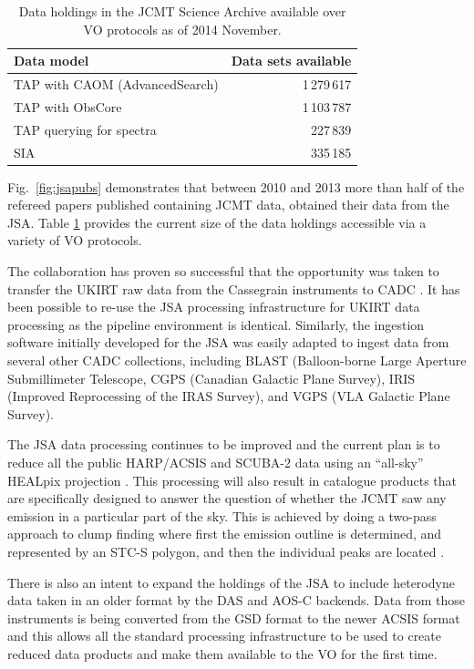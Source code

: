 \documentclass[final,authoryear,5p,times,twocolumn]{elsarticle}
\begin{document}
\begin{table}
\caption{Data holdings in the JCMT Science Archive available over VO
  protocols as of 2014 November.}
\label{tab:cadcvo}
\begin{center}
\begin{tabular}{|l|r|}
\hline
Data model & Data sets available\\ \hline
TAP with CAOM (AdvancedSearch) & 1\,279\,617 \\
TAP with ObsCore & 1\,103\,787\\
TAP querying for spectra & 227\,839\\
SIA  & 335\,185\\ \hline
\end{tabular}
\end{center}
\end{table}

Fig.~\ref{fig:jsapubs} demonstrates that between 2010 and 2013 more
than half of the refereed papers published containing JCMT data,
obtained their data from the JSA. Table \ref{tab:cadcvo} provides the
current size of the data holdings accessible via a variety of VO protocols.

The collaboration has proven so successful that the opportunity was
taken to transfer the UKIRT raw data from the Cassegrain instruments
to CADC \citep{adassxxiii_P01}. It has been possible to re-use
the JSA processing infrastructure for UKIRT data processing as the
pipeline environment is identical.  Similarly, the ingestion
software initially developed for the JSA was easily adapted to ingest
data from several other CADC collections, including BLAST
(Balloon-borne Large Aperture Submillimeter Telescope, CGPS
(Canadian Galactic Plane Survey), IRIS (Improved Reprocessing
of the IRAS Survey), and VGPS (VLA Galactic Plane Survey).

The JSA data processing continues to be improved
\citep{2014JCMTN35..19J} and the current plan is to reduce all the
public HARP/ACSIS and SCUBA-2 data using an ``all-sky'' HEALpix
projection \citep{2014SPIE9152-93,2014JCMTN35..20B}. This processing
will also result in catalogue products that are specifically designed
to answer the question of whether the JCMT saw any emission in a
particular part of the sky. This is achieved by doing a two-pass
approach to clump
finding where first the emission outline is determined, and represented
by an STC-S polygon, and then the individual peaks are located
\citep{2014JCMTN35..21G}.

There is also an intent to expand the holdings of the JSA to include
heterodyne data taken in an older format by the DAS
\citep{1986SPIE..598..134B} and AOS-C backends. Data from those
instruments is being converted from the GSD format \citep{GSD1999} to the newer ACSIS format and this
allows all the standard processing infrastructure to be used to create
reduced data products and make them available to the VO for the first
time.
\end{document}
